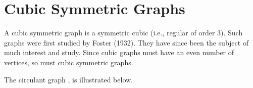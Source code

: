 \newpage\section{Cubic Symmetric Graphs}
A cubic symmetric graph is a symmetric cubic (i.e., regular of order 3). Such graphs were first studied by Foster (1932). They have since been the subject of much interest and study. Since cubic graphs must have an even number of vertices, so must cubic symmetric graphs.

The circulant graph , is illustrated below.

\subsection{}

\vspace*{2cm}
\begin{center}
\begin{tkzexample}[vbox]
\end{tkzexample} 
\end{center}

\vfill\newpage

\subsection{}

\vspace*{1cm}
\begin{center}
\begin{tkzexample}[vbox]
\end{tkzexample} 
\end{center}

\endinput